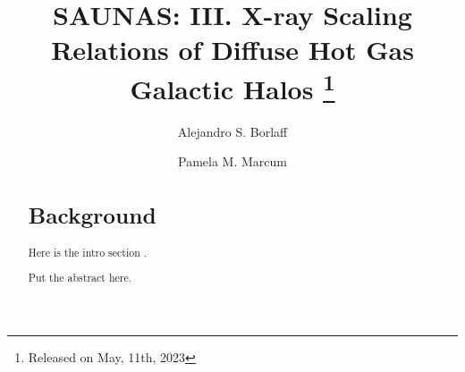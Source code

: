 \documentclass[modern]{CORE-AAS/aastex631}
\begin{document}
\title{\textbf{SAUNAS}: III. X-ray Scaling Relations of Diffuse Hot Gas Galactic Halos \footnote{Released on May, 11th, 2023}}
\author{Alejandro S. Borlaff}
\author{Pamela M. Marcum}

\begin{abstract}
\section{Background}
Here is the intro section \citep{borlaff+2017aap604_119}.

\begin{acknowledgements}
\end{acknowledgements}
\vspace{5mm}






Put the abstract here. 
 \end{abstract}
\end{document}
